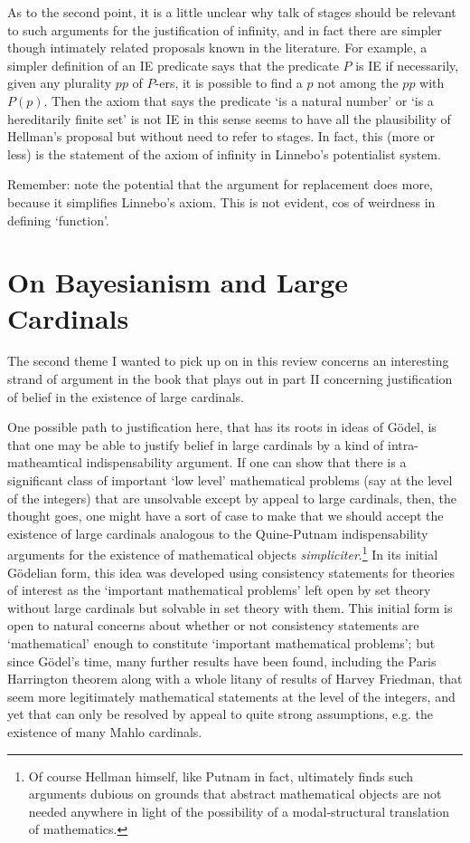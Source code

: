 \documentclass{asl}
\theoremstyle{definition}
\begin{document}
As to the second point, it is a little unclear why talk of stages 
should be relevant to such arguments for the justification of infinity, 
and in fact there are simpler though intimately related proposals known 
in the literature. For example, a simpler definition of an IE predicate says 
that the predicate $P$ is IE if necessarily, given any plurality $pp$ of $P$-ers, 
it is possible to find a $p$ not among the $pp$ with $P(p)$. 
Then the axiom that says the predicate `is a natural number' or 
`is a hereditarily finite set' is not IE in this sense seems to have 
all the plausibility of Hellman's proposal but without need to refer to stages. 
In fact, this (more or less) is the statement of the axiom of infinity in 
Linnebo's potentialist system.

Remember: note the potential that the argument for replacement does more,
because it simplifies Linnebo's axiom. This is not evident, 
cos of weirdness in defining `function'.

\section{On Bayesianism and Large Cardinals}

The second theme I wanted to pick up on in this review concerns an interesting
strand of argument in the book that plays out in part II concerning justification
of belief in the existence of large cardinals. 

One possible path to justification here, that has its roots in ideas of G\"odel, 
is that one may be able to justify belief in large cardinals by 
a kind of intra-matheamtical indispensability argument. If one can show that there
is a significant class of important `low level' mathematical problems 
(say at the level of the integers) that are unsolvable except
by appeal to large cardinals, then, the thought goes, one might have a sort of 
case to make that we should accept the existence of large cardinals
analogous to the Quine-Putnam indispensability arguments for the existence 
of mathematical objects \emph{simpliciter}.\footnote{
    Of course Hellman himself, like Putnam in fact, 
    ultimately finds such arguments dubious on grounds 
    that abstract mathematical objects are not needed anywhere
    in light of the possibility of a modal-structural translation 
    of mathematics.
} 
In its initial G\"odelian form, this idea was developed using consistency statements 
for theories of interest as the `important mathematical problems' left open by set theory
without large cardinals but solvable in set theory with them. This initial form is 
open to natural concerns about whether or not consistency statements are `mathematical'
enough to constitute `important mathematical problems'; but since G\"odel's time,
many further results have been found, including the Paris Harrington theorem 
along with a whole litany of results of Harvey Friedman, that seem more 
legitimately mathematical statements at the level of the integers, and yet
that can only be resolved by appeal to quite strong assumptions, e.g. the existence of
many Mahlo cardinals.
\end{document}
